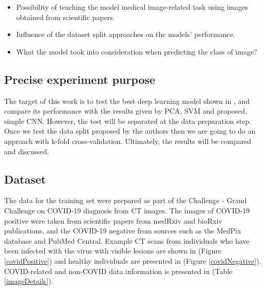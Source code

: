 \documentclass[runningheads]{llncs}
\begin{document}
\begin{itemize}
  \item Possibility of teaching the model medical image-related task using images obtained from scientific papers.
  \item Influence of the dataset split approaches on the models' performance.
  \item What the model took into consideration when predicting the class of image?
\end{itemize}

\subsection{Precise experiment purpose}

The target of this work is to test the best deep learning model shown in \cite{he2020sample}, and compare its performance with the results given by PCA, SVM and proposed, simple CNN. However, the test will be separated at the data preparation step. Once we test the data split proposed by the authors then we are going to do an approach with k-fold cross-validation. Ultimately, the results will be compared and discussed.

\subsection{Dataset}

The data for the training set were prepared as part of the Challenge - Grand Challenge on COVID-19 diagnosis from CT images. The images of COVID-19 positive were taken from scientific papers from medRxiv and bioRxiv publications, and the COVID-19 negative from sources such as the MedPix database and PubMed Central. Example CT scans from individuals who have been infected with the virus with visible lesions are shown in (Figure \ref{covidPositive}) and healthy individuals are presented in (Figure \ref{covidNegative}). COVID-related and non-COVID data information is presented in (Table \ref{imageDetails}).
\newline
\end{document}
